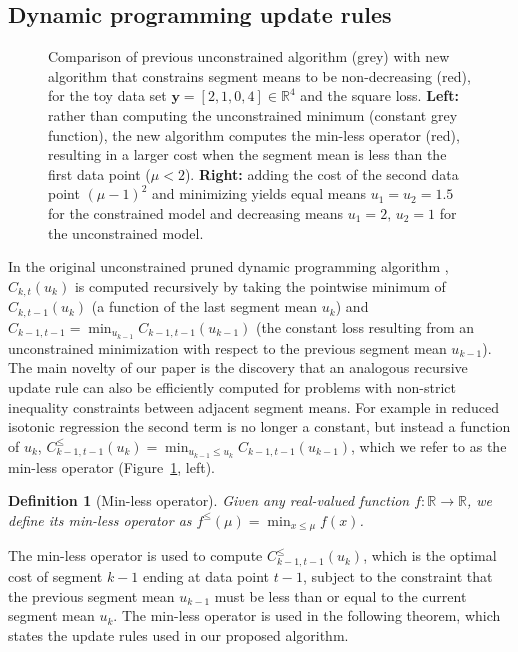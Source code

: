 \documentclass[aoas]{imsart}
\newtheorem{definition}{Definition}
\newcommand{\RR}{\mathbb R}
\begin{document}
\subsection{Dynamic programming update rules}
\label{sec:dyn-prog}

\begin{figure}[t!]
  \centering
  
  
  \vskip -0.5cm
  \caption{Comparison of previous unconstrained algorithm
    (\textcolor{Min}{grey}) with new algorithm that constrains segment
    means to be non-decreasing (\textcolor{Ckt}{red}), for the toy data
    set $\mathbf y= [ 2, 1, 0, 4 ] \in\RR^4$ and the square
    loss. \textbf{Left:} rather than computing the unconstrained
    minimum (constant grey function), the new algorithm computes the
    min-less operator (red), resulting in a larger cost when the
    segment mean is less than the first data point ($\mu <
    2$). \textbf{Right:} adding the cost of the second data point
    $(\mu-1)^2$ and minimizing yields equal means $u_1=u_2=1.5$ for
    the constrained model and decreasing means $u_1=2,\, u_2=1$ for
    the unconstrained model.}
  \label{fig:compare-unconstrained}
\end{figure}

In the original unconstrained pruned dynamic programming algorithm
\citep{pruned-dp}, $C_{k,t}(u_k)$ is computed recursively by taking
the pointwise minimum of $C_{k,t-1}(u_k)$ (a function of the last
segment mean $u_k$) and
$\hat C_{k-1,t-1} = \min_{u_{k-1}} C_{k-1,t-1}(u_{k-1})$ (the constant
loss resulting from an unconstrained minimization with respect to the
previous segment mean $u_{k-1}$). The main novelty of our paper is the
discovery that an analogous recursive update rule can also be
efficiently computed for problems with non-strict inequality constraints between adjacent segment means. For example in reduced
isotonic regression the second term is no longer a constant, but
instead a function of $u_k$,
$C_{k-1,t-1}^{\leq}(u_k) = \min_{u_{k-1}\leq u_k}
C_{k-1,t-1}(u_{k-1})$, which we refer to as the min-less operator
(Figure~\ref{fig:compare-unconstrained}, left).

\begin{definition}[Min-less operator]
\label{def:min-less}
  Given any real-valued function $f:\RR\rightarrow\RR$, we define its min-less
  operator as $f^\leq(\mu)=\min_{x\leq \mu} f(x)$.
\end{definition}

The min-less operator is used to compute $C_{k-1,t-1}^\leq(u_k)$,
which is the optimal cost of segment $k-1$ ending at data point $t-1$,
subject to the constraint that the previous segment mean $u_{k-1}$
must be less than or equal to the current segment mean $u_k$. The
min-less operator is used in the following theorem, which states the
update rules used in our proposed algorithm.
\end{document}

